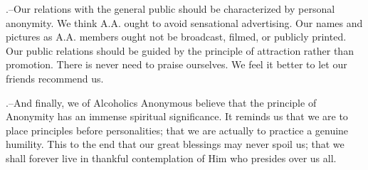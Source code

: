 \begin{biblechapter}
.--Our relations with the general public 
    should be characterized by personal anonymity.
    We think A.A. ought to avoid sensational advertising.
    Our names and pictures as A.A. members 
    ought not be broadcast, filmed, or publicly printed.
    Our public relations should be guided by the principle of attraction 
    rather than promotion.
    There is never need to praise ourselves.
    We feel it better to let our friends recommend us.

.--And finally, we of Alcoholics Anonymous 
    believe that the principle of Anonymity 
    has an immense spiritual significance.
    It reminds us that we are to place principles before personalities; 
    that we are actually to practice a genuine humility.
    This to the end that our great blessings may never spoil us; 
    that we shall forever live in thankful contemplation 
    of Him who presides over us all.
\end{biblechapter}

